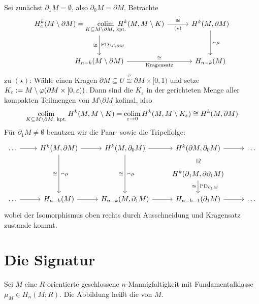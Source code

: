 \begin{beweis}
	Sei zunächst $\partial_1 M = \emptyset$, also $\partial _0 M = \partial M$.
	Betrachte 
	\[
		\begin{tikzcd}[column sep=3em, row sep=2.8em]
			\displaystyle H_c^k \enbrace*{M \setminus\partial M} = \smashoperator[r]{\colim_{K \subseteq M \setminus \partial M,\text{ kpt.} }}\,\, H^k(M, M \setminus K) \dar["\PD_{M \setminus \partial M}","\cong"']  \rar["\cong","(\star)"'] & H^k(M, \partial M) \dar["\capp \mu"] \\
			H_{n-k}\enbrace*{M\setminus \partial M}\rar["\cong","\text{Kragensatz}"'] & H_{n-k}(M)
		\end{tikzcd}
	\]
	zu $(\star)$: Wähle einen Kragen $\partial M \subseteq U \overset{\varphi}{\cong} \partial M \times [0,1)$ und setze $K_\varepsilon := M \setminus \varphi \enbrace*{\partial M \times [0,\varepsilon)}$.
	Dann sind die $K_\varepsilon$ in der gerichteten Menge aller kompakten Teilmengen von $M \setminus \partial M$ kofinal, also 
	\[
		\operatorname*{colim}_{K \subseteq M \setminus \partial M,\text{ kpt.} } H^k(M, M \setminus K) = \operatorname*{colim}_{\varepsilon\to 0} H^k(M,M \setminus K_\varepsilon) \cong H^k(M, \partial M) 
	\]
	Für $\partial_1 M \neq \emptyset$ benutzen wir die Paar- sowie die Tripelfolge:
	\[
		\begin{tikzcd}
			\ldots \rar & H^k(M, \partial M) \rar \ar[dd,"\capp \mu","\cong"'] & H^k(M,\partial_0 M) \rar \ar[dd,"\capp \mu","\cong"']& H^k(\partial M,\partial_0 M) \rar  \dar[phantom,sloped,"\cong"]& \ldots  \\
			& & & H^k \enbrace*{\partial_1 M, \partial \partial_1 M} \dar["\PD_{\partial_1 M}","\cong"'] \\
			\ldots \rar & H_{n-k}(M) \rar & H_{n-k}(M,\partial_1 M) \rar & H_{n-k-1}(\partial_1 M) \rar & \ldots 
		\end{tikzcd}
	\]
	wobei der Isomorphismus oben rechts durch Ausschneidung und Kragensatz zustande kommt.
\end{beweis}
\newpage

\section{Die Signatur} %
\label{sec:10}

\begin{definition}[{name=[Schnittform]}]
	Sei $M$ eine $R$-orientierte geschlossene $n$-Mannigfaltigkeit mit Fundamentalklasse $\mu_M \in H_n(M;R)$.
	Die Abbildung
	heißt die  von $M$. 
\end{definition}

